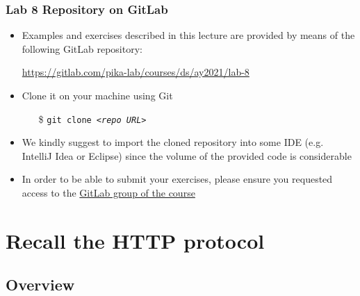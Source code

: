 \documentclass[presentation]{beamer}\mode<presentation>{\usetheme{AMSCesenaPurpleAndGold}}
\newcommand{\labN}{8}
\newcommand{\labGroup}{https://gitlab.com/pika-lab/courses/ds/ay2021}
\newcommand{\labRepo}{\labGroup/lab-\labN}
\begin{document}
\begin{frame}
\frametitle{Lab \labN{} Repository on GitLab}

	\begin{itemize}
		\item Examples and exercises described in this lecture are provided by means of the following GitLab repository:
		\begin{center}
			\url{\labRepo}
		\end{center}
		
		\vfill
		
		\item Clone it on your machine using Git
		\begin{itemize}
		    \item[\$] \texttt{git clone \textit{<repo URL>}}
		\end{itemize}
		
		\vfill
		
		\item We kindly suggest to import the cloned repository into some IDE (e.g. IntelliJ Idea or Eclipse) since the volume of the provided code is considerable
		
		\vfill
		
		\item In order to be able to submit your exercises, please ensure you requested access to the \href{\labGroup}{GitLab group of the course}
	\end{itemize}

\end{frame}


\section{Recall the HTTP protocol}

\subsection{Overview}
\end{document}
